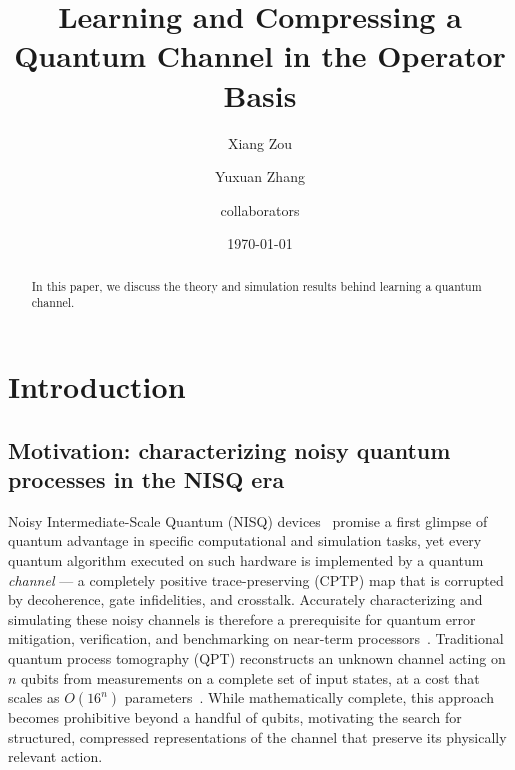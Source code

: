 \documentclass[%
 reprint,
superscriptaddress,
 amsmath,amssymb,
 aps,
]{revtex4-2}
\begin{document}

\title{Learning and Compressing a Quantum Channel in the Operator Basis}%

\author{Xiang Zou}
\author{Yuxuan Zhang}%
%
\author{collaborators}%
%
\date{\today}%

\begin{abstract}
In this paper, we discuss the theory and simulation results behind learning a quantum channel.
\end{abstract}

\maketitle


\section{Introduction}

\subsection*{Motivation: characterizing noisy quantum processes in the NISQ era}

Noisy Intermediate-Scale Quantum (NISQ) devices~\cite{preskill2018nisq} promise a first glimpse of quantum advantage in specific computational and simulation tasks, yet every quantum algorithm executed on such hardware is implemented by a quantum \emph{channel} — a completely positive trace-preserving (CPTP) map that is corrupted by decoherence, gate infidelities, and crosstalk. Accurately characterizing and simulating these noisy channels is therefore a prerequisite for quantum error mitigation, verification, and benchmarking on near-term processors~\cite{bharti2022nisq,cerezo2021variational}. Traditional quantum process tomography (QPT) reconstructs an unknown channel acting on $n$ qubits from measurements on a complete set of input states, at a cost that scales as $O(16^n)$ parameters~\cite{chuang1997prescription,mohseni2008tomography}. While mathematically complete, this approach becomes prohibitive beyond a handful of qubits, motivating the search for structured, compressed representations of the channel that preserve its physically relevant action.
\end{document}
